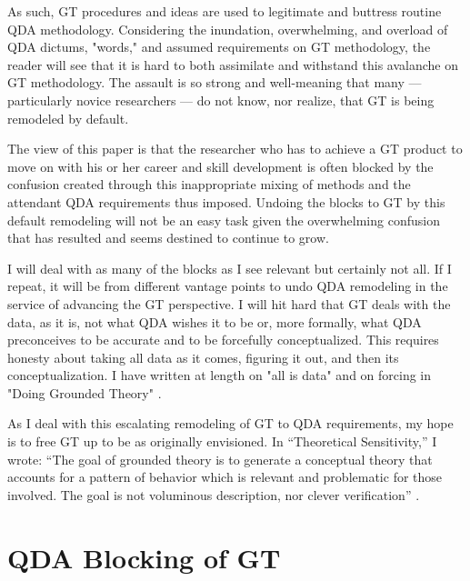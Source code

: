 As such, GT procedures and ideas are used to legitimate and buttress routine QDA methodology. 
Considering the inundation, overwhelming, and overload of QDA dictums, "words," and assumed requirements on GT methodology, the reader will see that it is hard to both assimilate and withstand this avalanche on GT methodology. 
The assault is so strong and well-meaning that many --- particularly novice researchers --- do not know, nor realize, that GT is being remodeled by default.

The view of this paper is that the researcher who has to achieve a GT product to move on with his or her career and skill development is often blocked by the confusion created through this inappropriate mixing of methods and the attendant QDA requirements thus imposed. 
Undoing the blocks to GT by this default remodeling will not be an easy task given the overwhelming confusion that has resulted and seems destined to continue to grow.

I will deal with as many of the blocks as I see relevant but certainly not all. 
If I repeat, it will be from different vantage points to undo QDA remodeling in the service of advancing the GT perspective. 
I will hit hard that GT deals with the data, as it is, not what QDA wishes it to be or, more formally, what QDA preconceives to be accurate and to be forcefully conceptualized. 
This requires honesty about taking all data as it comes, figuring it out, and then its conceptualization. 
I have written at length on "all is data" and on forcing in "Doing Grounded Theory" 
\citep{book.glaser98a}.

As I deal with this escalating remodeling of GT to QDA requirements, my hope is to free GT up to be as originally envisioned. 
In “Theoretical Sensitivity,” I wrote: “The goal of grounded theory is to generate a conceptual theory that accounts for a pattern of behavior which is relevant and problematic for those involved. 
The goal is not voluminous description, nor clever verification”
\citep{book.glaser78}.

\section*{QDA Blocking of GT}

